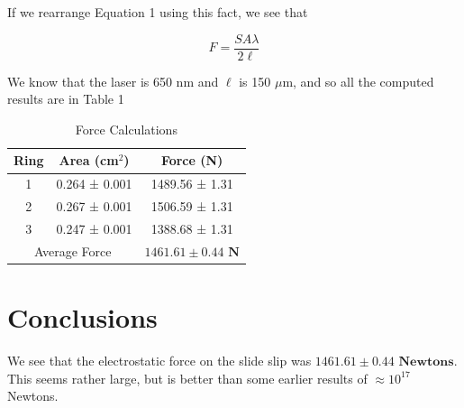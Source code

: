 \documentclass[12pt,letterpaper]{article}
\begin{document}
If we rearrange Equation 1 using this fact, we see that 

\begin{equation}
    F=\frac{SA\lambda}{2\ell}
\end{equation}

We know that the laser is 650 nm and $\ell$ is 150 $\mu$m, and so all the computed results are in Table 1

\begin{table}[h]
\centering
\begin{tabular}{|c|c|c|}
\hline
Ring & Area (cm$^2$) & Force (N) \\
\hline
1 & 0.264 ± 0.001 & 1489.56 ± 1.31 \\
2 & 0.267 ± 0.001 & 1506.59 ± 1.31 \\
3 & 0.247 ± 0.001 & 1388.68 ± 1.31 \\
\hline
\multicolumn{2}{|c|}{Average Force} & $\mathbf{1461.61 \pm 0.44} \textbf{ N}$ \\
\hline
\end{tabular}
\caption{Force Calculations}
\label{tab:force_results}
\end{table}

\section{Conclusions}

We see that the electrostatic force on the slide slip was $\mathbf{1461.61 \pm 0.44} \textbf{ Newtons}$. This seems rather large, but is better than some earlier results of $\approx 10^{17}$ Newtons.

% 
% 
\end{document}
